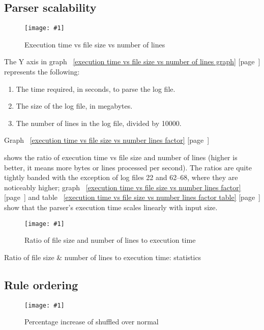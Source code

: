 \documentclass[a4paper,12pt,draft]{article}
\newcommand{\showgraph}[3]{
    \begin{figure}[hbt!]
        \caption{#2}\label{#3}
        \texttt{[image: \#1]}
    \end{figure}
}
\newcommand{\showtable}[3]{
    \begin{table}[ht]
        \caption{#2}\label{#3}
        
    \end{table}
}
\newcommand{\refwithpage}[1]{%
    \empty{}\ref{#1} [page~\pageref{#1}]%
}
\begin{document}
\subsection{Parser scalability}

\showgraph{build/plot-normal-filesize-numlines}{Execution time vs file
size vs number of lines}{execution time vs file size vs number of lines
graph}

The Y axis in graph~\refwithpage{execution time vs file size vs number of
lines graph} represents the following:

\begin{enumerate}

    \item The time required, in seconds, to parse the log file.

    \item The size of the log file, in megabytes.

    \item The number of lines in the log file, divided by 10000.

\end{enumerate}

Graph~\refwithpage{execution time vs file size vs number lines factor}
shows the ratio of execution time vs file size and number of lines (higher
is better, it means more bytes or lines processed per second).  The ratios
are quite tightly banded with the exception of log files 22 and 62--68,
where they are noticeably higher; graph~\refwithpage{execution time vs file
size vs number lines factor} and table~\refwithpage{execution time vs file
size vs number lines factor table} show that the parser's execution time
scales linearly with input size.

\showgraph{build/plot-normal-filesize-numlines-factor}{Ratio of file
size and number of lines to execution time}{execution time vs file size vs
number lines factor}

\showtable{build/stats-normal-filesize-line-count-include}{Ratio of file
size \& number of lines to execution time: statistics}{execution time vs
file size vs number lines factor table}

\clearpage

\subsection{Rule ordering}

\label{rule ordering graphs}

\showgraph{build/plot-normal-shuffle-factor}{Percentage increase of
shuffled over normal}{percentage increase of shuffled over normal}
\end{document}
